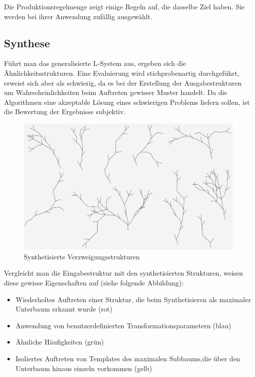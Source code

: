 Die Produktionsregelmenge zeigt einige Regeln auf, die dasselbe Ziel haben.
Sie werden bei ihrer Anwendung zufällig ausgewählt.


\subsection*{Synthese}
Führt man das generalisierte L-System aus, ergeben sich die Ähnlichkeitsstrukturen.
Eine Evaluierung wird stichprobenartig durchgeführt, erweist sich aber als schwierig, da
es bei der Erstellung der Ausgabestrukturen um Wahrscheinlichkeiten beim Auftreten gewisser
Muster handelt.
Da die Algorithmen eine akzeptable Lösung eines schwierigen Problems liefern sollen,
ist die Bewertung der Ergebnisse subjektiv.
\begin{figure}[H]
    \centering
    \includegraphics[width=14.5cm]{../images/synthesis.png}
    \caption{Synthetisierte Verzweigungsstrukturen}
\end{figure}

Vergleicht man die Eingabestruktur mit den synthetisierten Strukturen, weisen diese
gewisse Eigenschaften auf (siehe folgende Abbildung):
\begin{itemize}
    \item Wiederholtes Auftreten einer Struktur, die beim Synthetisieren als maximaler Unterbaum
    erkannt wurde (rot)
    \item Anwendung von benutzerdefinierten Transformationsparametern (blau)
    \item Ähnliche Häufigkeiten (grün)
    \item Isoliertes Auftreten von Templates des maximalen Subbaums,die über den Unterbaum
    hinaus einzeln vorkommen (gelb)
\end{itemize}

